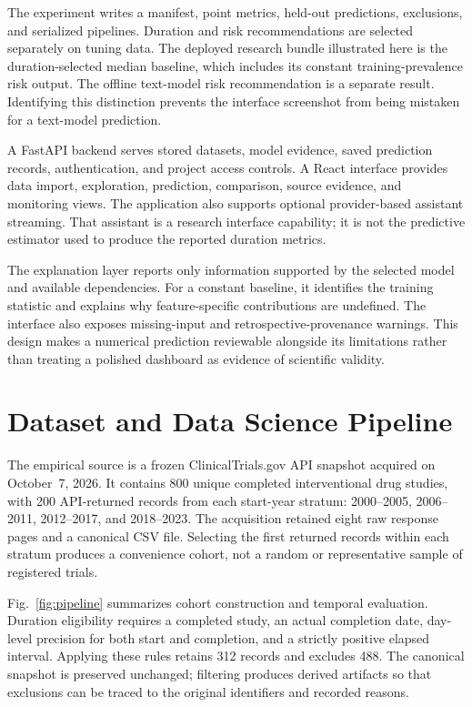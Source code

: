 \documentclass[10pt,letterpaper,twocolumn]{article}
\begin{document}
The experiment writes a manifest, point metrics, held-out predictions, exclusions, and serialized pipelines. Duration and risk recommendations are selected separately on tuning data. The deployed research bundle illustrated here is the duration-selected median baseline, which includes its constant training-prevalence risk output. The offline text-model risk recommendation is a separate result. Identifying this distinction prevents the interface screenshot from being mistaken for a text-model prediction.

A FastAPI backend serves stored datasets, model evidence, saved prediction records, authentication, and project access controls. A React interface provides data import, exploration, prediction, comparison, source evidence, and monitoring views. The application also supports optional provider-based assistant streaming. That assistant is a research interface capability; it is not the predictive estimator used to produce the reported duration metrics.

The explanation layer reports only information supported by the selected model and available dependencies. For a constant baseline, it identifies the training statistic and explains why feature-specific contributions are undefined. The interface also exposes missing-input and retrospective-provenance warnings. This design makes a numerical prediction reviewable alongside its limitations rather than treating a polished dashboard as evidence of scientific validity.

\section{Dataset and Data Science Pipeline}

The empirical source is a frozen ClinicalTrials.gov API snapshot acquired on October~7, 2026. It contains 800 unique completed interventional drug studies, with 200 API-returned records from each start-year stratum: 2000--2005, 2006--2011, 2012--2017, and 2018--2023. The acquisition retained eight raw response pages and a canonical CSV file. Selecting the first returned records within each stratum produces a convenience cohort, not a random or representative sample of registered trials.

Fig.~\ref{fig:pipeline} summarizes cohort construction and temporal evaluation. Duration eligibility requires a completed study, an actual completion date, day-level precision for both start and completion, and a strictly positive elapsed interval. Applying these rules retains 312 records and excludes 488. The canonical snapshot is preserved unchanged; filtering produces derived artifacts so that exclusions can be traced to the original identifiers and recorded reasons.
\end{document}
